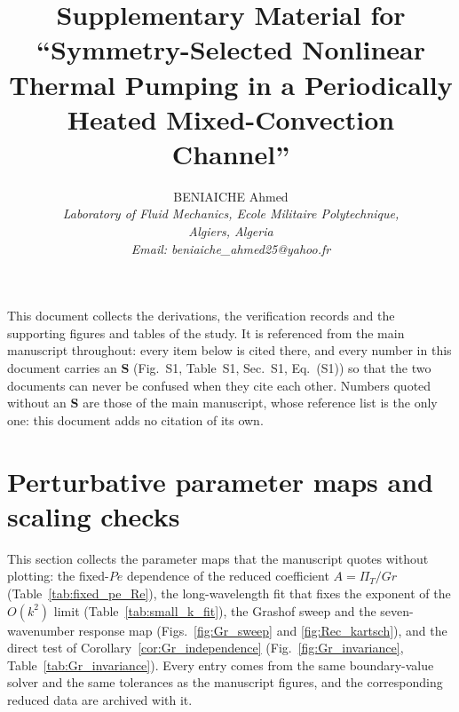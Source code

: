 \documentclass[12pt,a4paper]{article}
\newcommand{\Pe}{\mathit{Pe}}
\newcommand{\Grr}{\mathit{Gr}}
\newcommand{\PiT}{\Pi_T}
\begin{document}
\title{\textbf{Supplementary Material for ``Symmetry-Selected Nonlinear Thermal
       Pumping in a Periodically Heated Mixed-Convection Channel''}}
\author{BENIAICHE Ahmed \\
\textit{Laboratory of Fluid Mechanics, Ecole Militaire Polytechnique,} \\
\textit{Algiers, Algeria} \\
\textit{Email: beniaiche\_ahmed25@yahoo.fr}}
\date{}
\maketitle

\noindent This document collects the derivations, the verification records and the
supporting figures and tables of the study. It is referenced from the main
manuscript throughout: every item below is cited there, and every number in this
document carries an \textbf{S} (\mbox{Fig.~S1}, \mbox{Table~S1}, Sec.~S1,
\mbox{Eq.~(S1)}) so that the two documents can never be confused when they cite
each other. Numbers quoted without an \textbf{S} are those of the main
manuscript, whose reference list is the only one: this document adds no citation
of its own.

\section{Perturbative parameter maps and scaling checks}
\label{sec:maps}
This section collects the parameter maps that the manuscript quotes without
plotting: the fixed-$\Pe$ dependence of the reduced coefficient
$A=\PiT/\Grr$ (Table~\ref{tab:fixed_pe_Re}), the long-wavelength fit that fixes
the exponent of the $O(k^{2})$ limit (Table~\ref{tab:small_k_fit}), the Grashof
sweep and the seven-wavenumber response map
(Figs.~\ref{fig:Gr_sweep} and \ref{fig:Rec_kartsch}), and the direct test of
Corollary~\ref{cor:Gr_independence} (Fig.~\ref{fig:Gr_invariance},
Table~\ref{tab:Gr_invariance}). Every entry comes from
the same boundary-value solver and the same tolerances as the manuscript
figures, and the corresponding reduced data are archived with it.
\end{document}

